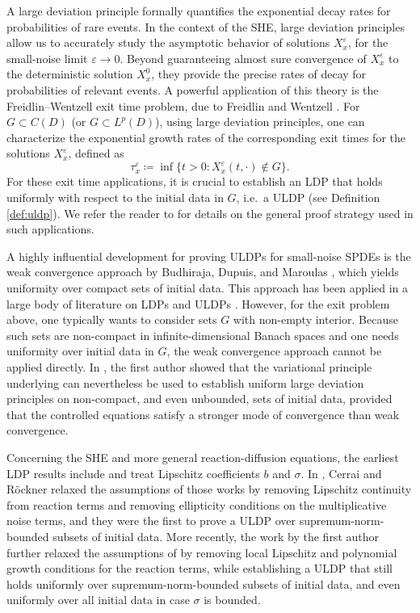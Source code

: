 \documentclass[10pt,a4paper]{amsart}
\numberwithin{equation}{section}
\newcommand{\ceqq}{\coloneqq}
\newcommand{\eps}{\varepsilon}
\begin{document}
A large deviation principle formally quantifies the  exponential decay rates for probabilities of rare events. In the context of the SHE, large deviation principles allow  us to accurately study the asymptotic behavior of solutions  $X_x^\eps$, for the small-noise limit $\eps\to 0$. Beyond guaranteeing almost sure convergence of $X_x^\eps$ to the deterministic solution $X_x^0$, they   provide the precise rates of decay for probabilities of relevant events. A powerful application of this theory is the Freidlin--Wentzell exit time problem, due to Freidlin and Wentzell \cite{FW3rdedition}. For $G\subset C(D)$ (or $G\subset L^p(D)$), using large deviation principles, one can characterize the exponential
growth rates of the corresponding exit times for the solutions $X_x^\eps$, defined as
\[
\tau^\eps_x\ceqq \inf\{t>0:X_x^\eps(t,\cdot)\notin G\}. 
\]
For these exit time applications, it is crucial to establish an LDP that holds uniformly with respect to the initial data in $G$, i.e.\ a ULDP (see Definition \ref{def:uldp}). We refer the reader to  \cite{FW3rdedition,DZ10} for details on the general proof strategy used in such applications. 

A highly influential development for proving ULDPs for small-noise SPDEs is the weak convergence approach by Budhiraja, Dupuis, and Maroulas \cite{BDM08}, which yields uniformity over compact sets of initial data. This approach has been applied in a large body of literature on LDPs \cite{LDP1,LDP2,LDP3,LDP4,LDP5,LDP6,LDP7,LDP8,LDP9,LDP10,LDP11,LDP12,LDP13,LDP14,LDP15,LDP16,LDP17,LDP18,LDP19,LDP20,LDP21,LDP22,LDP23} and ULDPs \cite{ULDP1,ULDP2,ULDP3,ULDP4}.  However, for the exit problem above, one typically wants to consider sets $G$ with  non-empty interior. Because such sets are non-compact in infinite-dimensional Banach spaces and one needs uniformity over initial data in $G$,   the weak convergence approach cannot be applied directly. 
In \cite{Salins19equivalences}, the first  author showed that the variational principle underlying \cite{BDM08} can nevertheless be used to establish uniform large deviation principles on non-compact, and even unbounded, sets of initial data, provided that the controlled equations satisfy a stronger mode of convergence than weak convergence. 


Concerning the SHE and more general reaction-diffusion equations,  the earliest LDP results include \cite{freidlin88,Sowers92,KX96} and treat Lipschitz coefficients $b$ and $\sigma$.  
In \cite{CR04}, Cerrai and R\"ockner relaxed the assumptions of those works by removing Lipschitz
continuity from reaction terms and removing  ellipticity conditions on the multiplicative noise terms, and they were the first to prove a ULDP over supremum-norm-bounded subsets of initial data.  
More recently, the work \cite{Salins21reacdiff} by the first author further relaxed the assumptions of \cite{CR04}  by removing  local Lipschitz
 and polynomial growth conditions for the reaction terms, while establishing a  ULDP that still holds   uniformly over supremum-norm-bounded subsets of initial data, and even uniformly over all initial data in case $\sigma$ is bounded. 
\end{document}
